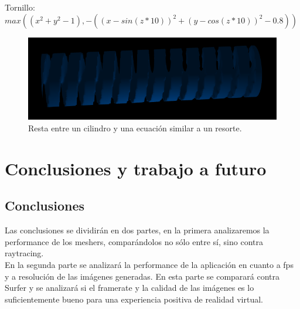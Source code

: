 \documentclass[12pt]{article}
\begin{document}
\clearpage
Tornillo: $max((x^2 + y^2 - 1) ,-((x-sin(z*10) )^2 + (y -cos (z*10))^2 -0.8))$ \\
\begin{figure}[h!]
\includegraphics[width=0.7\linewidth,center]{g5.png}
\caption{Resta entre un cilindro y una ecuación similar a un resorte.}
\end{figure}

\clearpage
\section{Conclusiones y trabajo a futuro}
\subsection{Conclusiones}
Las conclusiones se dividirán en dos partes, en la primera analizaremos la performance de los meshers, comparándolos no sólo entre sí, sino contra raytracing. 
\\En la segunda parte se analizará la performance de la aplicación en cuanto a fps y a resolución de las imágenes generadas. En esta parte se comparará contra Surfer y se analizará si el framerate y la calidad de las imágenes es lo suficientemente bueno para una experiencia positiva de realidad virtual.
\end{document}
